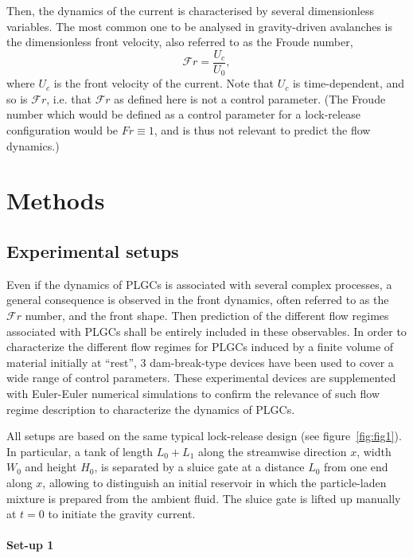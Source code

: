 \documentclass[twocolumn]{article}
\begin{document}
Then, the dynamics of the current is characterised by several dimensionless variables. The most common one to be analysed in gravity-driven avalanches is the dimensionless front velocity, also referred to as the Froude number,
\begin{equation}
	\displaystyle \mathcal{F}r =\frac{U_c}{U_0},
\end{equation}
where $U_c$ is the front velocity of the current. Note that $U_c$ is time-dependent, and so is $\mathcal{F}r$, i.e. that $\mathcal{F}r$ as defined here is not a control parameter. (The Froude number which would be defined as a control parameter for a lock-release configuration would be $Fr\equiv 1$, and is thus not relevant to predict the flow dynamics.)

\section{Methods}

\subsection{Experimental setups}
Even if the dynamics of PLGCs is associated with several complex processes, a general consequence is observed in the front dynamics, often referred to as the $\mathcal{F}r$ number, and the front shape. Then prediction of the different flow regimes associated with PLGCs shall be entirely included in these observables. In order to characterize the different flow regimes for PLGCs induced by a finite volume of material initially at ``rest'', 3 dam-break-type devices have been used to cover a wide range of control parameters. These experimental devices are supplemented with Euler-Euler numerical simulations to confirm the relevance of such flow regime description to characterize the dynamics of PLGCs.

All setups are based on the same typical lock-release design (see figure~\ref{fig:fig1}). In particular, a tank of length $L_0+L_1$ along the streamwise direction $x$, width $W_0$ and height $H_0$, is separated by a sluice gate at a distance $L_0$ from one end along $x$, allowing to distinguish an initial reservoir in which the particle-laden mixture is prepared from the ambient fluid. The sluice gate is lifted up manually at $t=0$ to initiate the gravity current.

\paragraph{Set-up 1}
\end{document}
